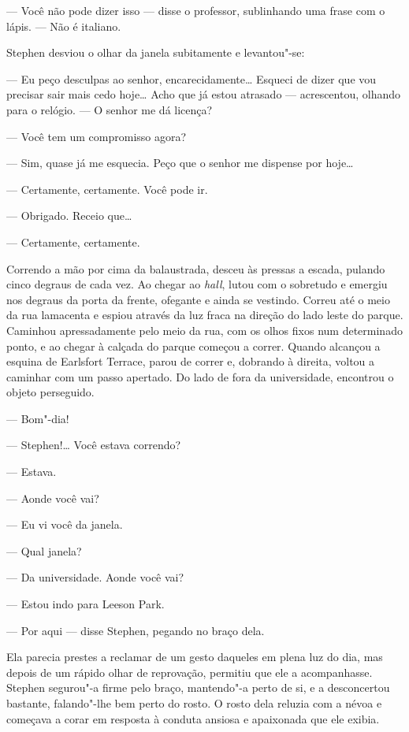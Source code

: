 --- Você não pode dizer isso --- disse o professor, sublinhando uma frase com o
lápis.  --- Não é italiano.

Stephen desviou o olhar da janela subitamente e levantou"-se:

--- Eu peço desculpas ao senhor, encarecidamente\ldots{}  Esqueci de dizer que vou
precisar sair mais cedo hoje\ldots{}  Acho que já estou atrasado --- acrescentou,
olhando para o relógio.  --- O senhor me dá licença?

--- Você tem um compromisso agora?

--- Sim, quase já me esquecia.  Peço que o senhor me dispense por hoje\ldots{}

--- Certamente, certamente.  Você pode ir.

--- Obrigado.  Receio que\ldots{}

--- Certamente, certamente.

Correndo a mão por cima da balaustrada, desceu às pressas a escada, pulando
cinco degraus de cada vez.  Ao chegar ao \textit{hall}, lutou com o sobretudo e
emergiu nos degraus da porta da frente, ofegante e ainda se vestindo.  Correu
até o meio da rua lamacenta e espiou através da luz fraca na direção do lado
leste do parque.  Caminhou apressadamente pelo meio da rua, com os olhos fixos
num determinado ponto, e ao chegar à calçada do parque começou a correr.
Quando alcançou a esquina de Earlsfort Terrace, parou de correr e, dobrando à
direita, voltou a caminhar com um passo apertado.  Do lado de fora da
universidade, encontrou o objeto perseguido.

--- Bom"-dia!

--- Stephen!\ldots{}  Você estava correndo?

--- Estava.

--- Aonde você vai?

--- Eu vi você da janela.

--- Qual janela?

--- Da universidade.  Aonde você vai?

--- Estou indo para Leeson Park.

--- Por aqui --- disse Stephen, pegando no braço dela.

Ela parecia prestes a reclamar de um gesto daqueles em plena luz do dia, mas
depois de um rápido olhar de reprovação, permitiu que ele a acompanhasse.
Stephen segurou"-a firme pelo braço, mantendo"-a perto de si, e a desconcertou
bastante, falando"-lhe bem perto do rosto.  O rosto dela reluzia com a névoa e
começava a corar em resposta à conduta ansiosa e apaixonada que ele exibia.  

